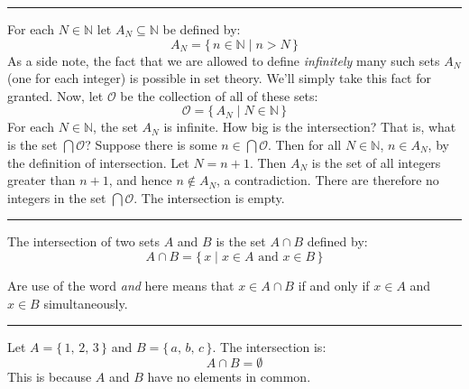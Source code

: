             \hrule
            \begin{example}
                For each $N\in\mathbb{N}$ let $A_{N}\subseteq\mathbb{N}$ be
                defined by:
                \begin{equation}
                    A_{N}=\{\,n\in\mathbb{N}\;|\;n>N\,\}
                \end{equation}
                As a side note, the fact that we are allowed to define
                \textit{infinitely} many such sets $A_{N}$ (one for each
                integer) is possible in set theory. We'll simply take this
                fact for granted. Now, let $\mathcal{O}$ be the collection
                of all of these sets:
                \begin{equation}
                    \mathcal{O}=\{\,A_{N}\;|\;N\in\mathbb{N}\,\}
                \end{equation}
                For each $N\in\mathbb{N}$, the set $A_{N}$ is infinite.
                How big is the intersection? That is, what is the set
                $\bigcap\mathcal{O}$? Suppose there is some
                $n\in\bigcap\mathcal{O}$. Then for all $N\in\mathbb{N}$,
                $n\in{A}_{N}$, by the definition of intersection.
                Let $N=n+1$. Then $A_{N}$ is the set of all integers
                greater than $n+1$, and hence $n\notin{A}_{N}$, a
                contradiction. There are therefore no integers in the
                set $\bigcap\mathcal{O}$. The intersection is empty.
            \end{example}
            \hrule\par\hfill\par
            \begin{definition}
                The intersection of two sets $A$ and $B$ is the set
                $A\cap{B}$ defined by:
                \begin{equation}
                    A\cap{B}=\{\,x\;|\;x\in{A}\textrm{ and }x\in{B}\,\}
                \end{equation}
            \end{definition}
            Are use of the word \textit{and} here means that
            $x\in{A}\cap{B}$ if and only if $x\in{A}$ and $x\in{B}$
            simultaneously.
            \par\hfill\par\hrule
            \begin{example}
                Let $A=\{\,1,\,2,\,3\,\}$ and $B=\{\,a,\,b,\,c\,\}$. The
                intersection is:
                \begin{equation}
                    A\cap{B}=\emptyset
                \end{equation}
                This is because $A$ and $B$ have no elements in common.
            \end{example}
